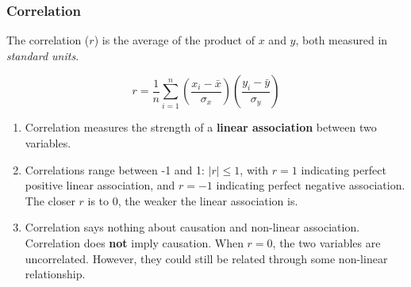 \documentclass[
  letterpaper,
  DIV=11,
  numbers=noendperiod]{scrreprt}
\providecommand{\tightlist}{%
  \setlength{\itemsep}{0pt}\setlength{\parskip}{0pt}}\usepackage{longtable,booktabs,array}
\begin{document}
\subsubsection{Correlation}\label{correlation}

The correlation (\(r\)) is the average of the product of \(x\) and
\(y\), both measured in \emph{standard units}.

\[r = \frac{1}{n} \sum_{i=1}^n (\frac{x_i - \bar{x}}{\sigma_x})(\frac{y_i - \bar{y}}{\sigma_y})\]

\begin{enumerate}
\def\labelenumi{\arabic{enumi}.}
\tightlist
\item
  Correlation measures the strength of a \textbf{linear association}
  between two variables.
\item
  Correlations range between -1 and 1: \(|r| \leq 1\), with \(r=1\)
  indicating perfect positive linear association, and \(r=-1\)
  indicating perfect negative association. The closer \(r\) is to \(0\),
  the weaker the linear association is.
\item
  Correlation says nothing about causation and non-linear association.
  Correlation does \textbf{not} imply causation. When \(r = 0\), the two
  variables are uncorrelated. However, they could still be related
  through some non-linear relationship.
\end{enumerate}
\end{document}
